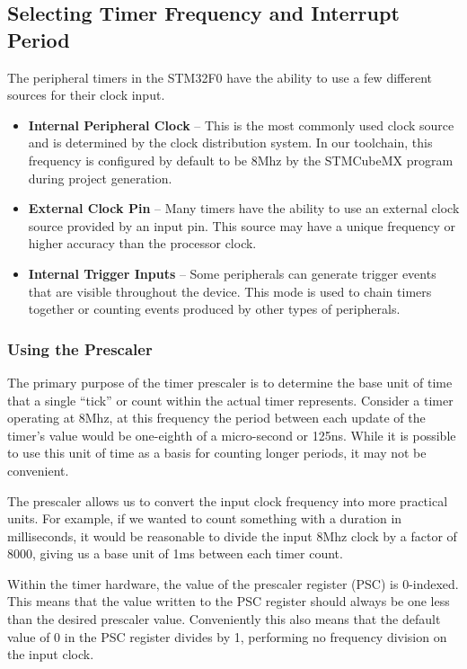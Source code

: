 \documentclass[11pt,fleqn]{book} %
\begin{document}
    \subsection{Selecting Timer Frequency and Interrupt Period}	
    The peripheral timers in the STM32F0 have the ability to use a few different sources for their clock input. 
    \begin{itemize}
        \item\textbf{Internal Peripheral Clock} -- This is the most commonly used clock source and is determined by the clock distribution system. In our toolchain, this frequency is configured by default to be 8Mhz by the STMCubeMX program during project generation. 
        \item\textbf{External Clock Pin} -- Many timers have the ability to use an external clock source provided by an input pin. This source may have a unique frequency or higher accuracy than the processor clock.
        \item\textbf{Internal Trigger Inputs} -- Some peripherals can generate trigger events that are visible throughout the device. This mode is used to chain timers together or counting events produced by other types of peripherals.
    \end{itemize}
 
    \subsubsection{Using the Prescaler}
      
        The primary purpose of the timer prescaler is to determine the base unit of time that a single ``tick'' or count within the actual timer represents. Consider a timer operating at 8Mhz, at this frequency the period between each update of the timer's value would be one-eighth of a micro-second or 125ns. While it is possible to use this unit of time as a basis for counting longer periods, it may not be convenient. 
        
        The prescaler allows us to convert the input clock frequency into more practical units. For example, if we wanted to count something with a duration in milliseconds, it would be reasonable to divide the input 8Mhz clock by a factor of 8000, giving us a base unit of 1ms between each timer count. 
        
        Within the timer hardware, the value of the prescaler register (PSC) is 0-indexed. This means that the value written to the PSC register should always be one less than the desired prescaler value. Conveniently this also means that the default value of 0 in the PSC register divides by 1, performing no frequency division on the input clock.  
\end{document}
